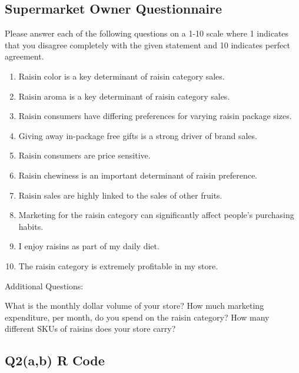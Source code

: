 \documentclass[10pt, oneside,spanish]{article}
\begin{document}
\pagebreak

\subsection{Supermarket Owner Questionnaire}


Please answer each of the following questions on a 1-10 scale where 1 indicates that you disagree completely with the given statement and 10 indicates perfect agreement.
\begin{enumerate}


\item Raisin color is a key determinant of raisin category sales.
\item Raisin aroma is a key determinant of raisin category sales.
\item Raisin consumers have differing preferences for varying raisin package sizes.
\item Giving away in-package free gifts is a strong driver of brand sales.
\item Raisin consumers are price sensitive.
\item Raisin chewiness is an important determinant of raisin preference.
\item Raisin sales are highly linked to the sales of other fruits.
\item Marketing for the raisin category can significantly affect people’s purchasing habits.
\item I enjoy raisins as part of my daily diet.
\item The raisin category is extremely profitable in my store.

\end{enumerate}

Additional Questions: 

What is the monthly dollar volume of your store?
How much marketing expenditure, per month, do you spend on the raisin category?
How many different SKUs of raisins does your store carry?

\pagebreak

\subsection{Q2(a,b) R Code }
\end{document}

